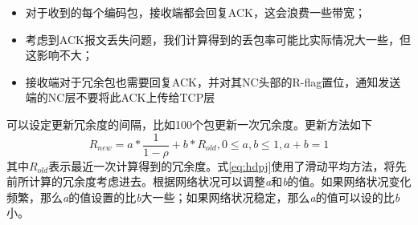 \begin{itemize}[leftmargin=.5in]
	\item 对于收到的每个编码包，接收端都会回复ACK，这会浪费一些带宽；
	\item 考虑到ACK报文丢失问题，我们计算得到的丢包率可能比实际情况大一些，但这影响不大；
	\item 接收端对于冗余包也需要回复ACK，并对其NC头部的R-flag置位，通知发送端的NC层不要将此ACK上传给TCP层
\end{itemize}
\par
可以设定更新冗余度的间隔，比如100个包更新一次冗余度。更新方法如下
\begin{equation}\label{eq:hdpj}
R_{new}=a*\frac{1}{1-\rho}+b*R_{old},0 \le a,b \le 1,a+b=1
\end{equation}
其中$R_{old}$表示最近一次计算得到的冗余度。式\ref{eq:hdpj}使用了滑动平均方法，将先前所计算的冗余度考虑进去。根据网络状况可以调整\emph{a}和\emph{b}的值。如果网络状况变化频繁，那么\emph{a}的值设置的比\emph{b}大一些；如果网络状况稳定，那么\emph{a}的值可以设的比\emph{b}小。

